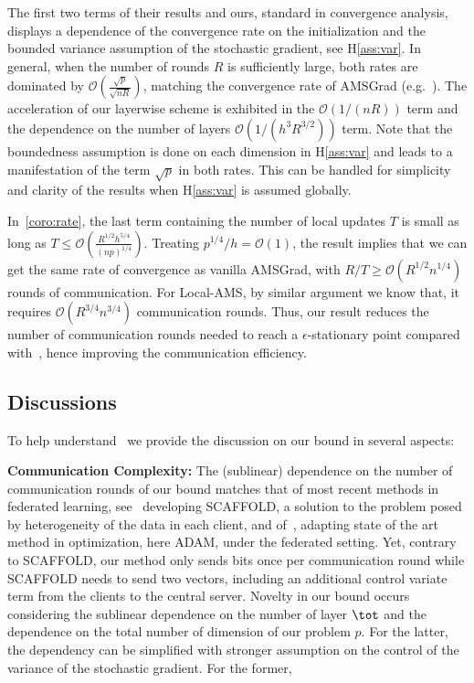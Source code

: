 \documentclass[twoside]{article}
\begin{document}
The first two terms of their results and ours, standard in convergence analysis, displays a dependence of the convergence rate on the initialization and the bounded variance assumption of the stochastic gradient, see H\ref{ass:var}. In general, when the number of rounds $R$ is sufficiently large, both rates are dominated by $\mathcal O(\frac{\sqrt p}{\sqrt{n R}})$, matching the convergence rate of AMSGrad (e.g.~\cite{Arxiv:Zhou_18}).
The acceleration of our layerwise scheme is exhibited in the $\mathcal O(1/(n R))$ term and the dependence on the number of layers $\mathcal O(1/(h^3 R^{3/2}))$ term. Note that the boundedness assumption is done on each dimension in H\ref{ass:var} and leads to a manifestation of the term $\sqrt{p}$ in both rates. This can be handled for simplicity and clarity of the results when H\ref{ass:var} is assumed globally.

In~\eqref{coro:rate}, the last term containing the number of local updates $T$ is small as long as $T\leq \mathcal O(\frac{R^{1/2}h^{5/4}}{(np)^{1/4}})$. 
Treating $p^{1/4}/h=\mathcal O(1)$, the result implies that we can get the same rate of convergence as vanilla AMSGrad, with $R/T\geq \mathcal{O}(R^{1/2}n^{1/4})$ rounds of communication. For Local-AMS, by similar argument we know that, it requires $\mathcal O(R^{3/4}n^{3/4})$ communication rounds. Thus, our result reduces the number of communication rounds needed to reach a $\epsilon$-stationary point compared with~\cite{chen2020toward}, hence improving the communication efficiency.


\subsection{Discussions}
To help understand \algo\, we provide the discussion on our bound in several aspects:

\medskip
\textbf{Communication Complexity:} The (sublinear) dependence on the number of communication rounds of our bound matches that of most recent methods in federated learning, see~\citet{karimireddy2019scaffold} developing SCAFFOLD, a solution to the problem posed by heterogeneity of the data in each client, and of~\cite{reddi2020adaptive}, adapting state of the art method in optimization, here ADAM, under the federated setting. 
Yet, contrary to SCAFFOLD, our method only sends bits once per communication round while SCAFFOLD needs to send two vectors, including an additional control variate term  from the clients to the central server.
Novelty in our bound occurs considering the sublinear dependence on the number of layer $\tot$ and the dependence on the total number of dimension of our problem $p$. For the latter, the dependency can be simplified with stronger assumption on the control of the variance of the stochastic gradient. For the former, 
\end{document}
